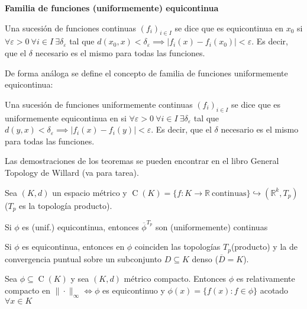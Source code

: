 \documentclass[openany]{book}
\begin{document}
\begin{definition}
    \textbf{Familia de funciones (uniformemente) equicontinua}

    Una sucesión de funciones continuas $ (f_{i})_{i \in I} $ se dice que es equicontinua en $ x_0 $ si $ \forall  \varepsilon > 0\ \forall i \in I\  \exists \delta_{\varepsilon}$ tal que $ d(x_0,x) < \delta_{\varepsilon} \implies |f_{i}(x)-f_{i}(x_0)| < \varepsilon $. Es decir, que el $ \delta  $ necesario es el mismo para todas las funciones.
    
    De forma análoga se define el concepto de familia de funciones uniformemente equicontinua:
    
    Una sucesión de funciones uniformemente continuas $ (f_{i})_{i \in I} $ se dice que es uniformemente equicontinua en si $ \forall  \varepsilon > 0\ \forall i \in I\  \exists \delta_{\varepsilon}$ tal que $ d(y,x) < \delta_{\varepsilon} \implies |f_{i}(x)-f_{i}(y)| < \varepsilon $. Es decir, que el $ \delta  $ necesario es el mismo para todas las funciones.
\end{definition}

Las demostraciones de los teoremas se pueden encontrar en el libro General Topology de Willard (va para tarea).

\begin{theorem}
    Sea $ (K,d) $ un espacio métrico y $ \operatorname{C}(K) = \{f: K \to \mathbb{R}\ \text{continuas}\} \hookrightarrow (\mathbb{R}^{k},T_{p}) $ ($ T_{p} $ es la topología producto). 

    Si $ \phi $ es (unif.) equicontinua, entonces $ \overline{\phi}^{T_{p}}  $ son (uniformemente) continuas
\end{theorem}

\begin{theorem}
    Si $ \phi $ es equicontinua, entonces en $ \phi $ coinciden las topologías $ T_{p} $(producto) y la de convergencia puntual sobre un subconjunto $ D \subseteq K $ denso ($ \overline{D} = K $).
\end{theorem}


\begin{theorem}
    Sea $ \phi \subseteq  \operatorname{C}(K)$ y sea $ (K,d) $ métrico compacto. Entonces $ \phi $ es relativamente compacto en $ \|\cdot \|_{\infty} \iff \phi  $ es equicontinuo y $ \phi(x) = \{f(x): f \in \phi\} $ acotado $ \forall x \in K $
\end{theorem}


\end{document}
